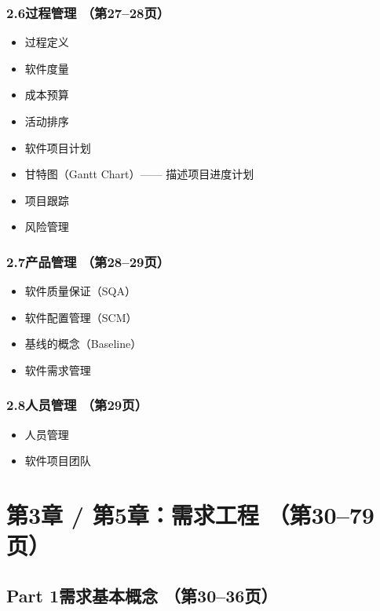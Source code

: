 \documentclass[12pt,a4paper]{ctexart}
\begin{document}
\subsubsection{2.6\quad 过程管理 \hfill（第27--28页）}
\begin{itemize}
    \item 过程定义
    \item 软件度量
    \item 成本预算
    \item 活动排序
    \item 软件项目计划
    \item 甘特图（Gantt Chart）—— 描述项目进度计划
    \item 项目跟踪
    \item 风险管理
\end{itemize}

\subsubsection{2.7\quad 产品管理 \hfill（第28--29页）}
\begin{itemize}
    \item 软件质量保证（SQA）
    \item 软件配置管理（SCM）
    \item 基线的概念（Baseline）
    \item 软件需求管理
\end{itemize}

\subsubsection{2.8\quad 人员管理 \hfill（第29页）}
\begin{itemize}
    \item 人员管理
    \item 软件项目团队
\end{itemize}

\vspace{0.3cm}
\section{第3章 / 第5章：需求工程 \hfill（第30--79页）}

\subsection{Part 1\quad 需求基本概念 \hfill（第30--36页）}
\end{document}
